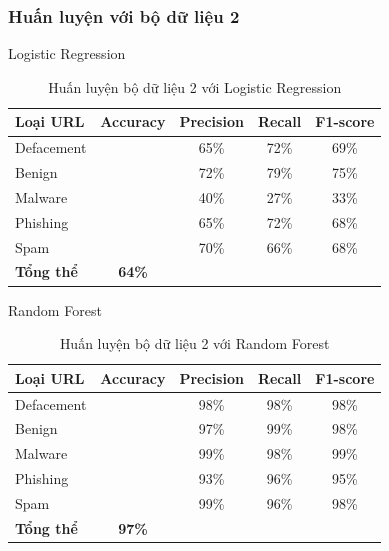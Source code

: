 \documentclass[13pt]{article}
\begin{document}
\subsubsection{Huấn luyện với bộ dữ liệu 2}
Logistic Regression
\begin{table}[h]
    \centering
    \renewcommand{\arraystretch}{1.3} %
    \begin{tabular}{|l|c|c|c|c|}
        \hline
        \rowcolor[HTML]{C0C0C0} %
        \textbf{Loại URL} & \textbf{Accuracy} & \textbf{Precision} & \textbf{Recall} & \textbf{F1-score} \\ 
        \hline
        Defacement &  & 65\% & 72\% & 69\% \\ 
        \hline
        Benign &  & 72\% & 79\% & 75\% \\ 
        \hline
        Malware &  & 40\% & 27\% & 33\% \\ 
        \hline
        Phishing &  & 65\% & 72\% & 68\% \\ 
        \hline
        Spam &  & 70\% & 66\% & 68\% \\ 
        \hline
        \textbf{Tổng thể} & \textbf{64\%} &  &  &  \\ 
        \hline
    \end{tabular}
    \caption{Huấn luyện bộ dữ liệu 2 với Logistic Regression}
    \label{tab:logistic_regression}
\end{table}

Random Forest
\begin{table}[h]
    \centering
    \renewcommand{\arraystretch}{1.3} %
    \begin{tabular}{|l|c|c|c|c|}
        \hline
        \rowcolor[HTML]{C0C0C0} %
        \textbf{Loại URL} & \textbf{Accuracy} & \textbf{Precision} & \textbf{Recall} & \textbf{F1-score} \\ 
        \hline
        Defacement &  & 98\% & 98\% & 98\% \\ 
        \hline
        Benign &  & 97\% & 99\% & 98\% \\ 
        \hline
        Malware &  & 99\% & 98\% & 99\% \\ 
        \hline
        Phishing &  & 93\% & 96\% & 95\% \\ 
        \hline
        Spam &  & 99\% & 96\% & 98\% \\ 
        \hline
        \textbf{Tổng thể} & \textbf{97\%} &  &  &  \\ 
        \hline
    \end{tabular}
    \caption{Huấn luyện bộ dữ liệu 2 với Random Forest}
    \label{tab:logistic_regression}
\end{table}
\end{document}
